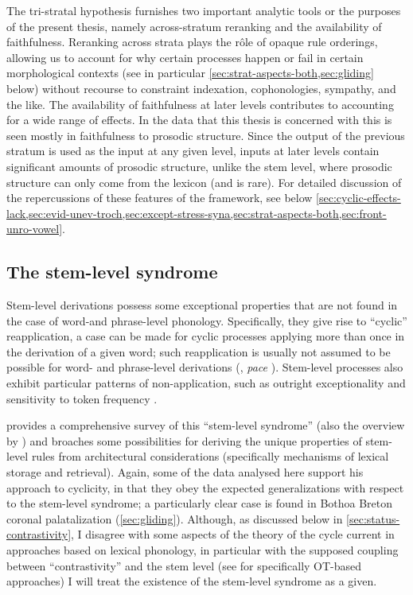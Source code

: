 The tri\hyp stratal hypothesis furnishes two important analytic tools or the purposes of the present thesis, namely across\hyp stratum reranking and the availability of faithfulness. Reranking across strata plays the rôle of opaque rule orderings, allowing us to account for why certain processes happen or fail in certain morphological contexts (see in particular \cref{sec:strat-aspects-both,sec:gliding} below) without recourse to constraint indexation, cophonologies, sympathy, and the like. The availability of faithfulness at later levels contributes to accounting for a wide range of effects. In the data that this thesis is concerned with this is seen mostly in faithfulness to prosodic structure. Since the output of the previous stratum is used as the input at any given level, inputs at later levels contain significant amounts of prosodic structure, unlike the stem level, where prosodic structure can only come from the lexicon (and is rare). For detailed discussion of the repercussions of these features of the framework, see below \cref{sec:cyclic-effects-lack,sec:evid-unev-troch,sec:except-stress-syna,sec:strat-aspects-both,sec:front-unro-vowel}.

\subsection{The stem-level syndrome}
\label{sec:stem-level-syndrome}

Stem\hyp level derivations possess some exceptional properties that are not found in the case of word\hyp and phrase\hyp level phonology. Specifically, they give rise to \enquote{cyclic} reapplication, \ie a case can be made for cyclic processes applying more than once in the derivation of a given word; such reapplication is usually not assumed to be possible for word- and phrase\hyp level derivations (\citealp[§4.3]{scheer10:_guide_morph}, \emph{pace} \citealp{mchugh90:_kirun_chaga}). Stem\hyp level processes also exhibit particular patterns of non\hyp application, such as outright exceptionality and sensitivity to token frequency \citep[\cf in particular][]{collie07:_englis_strat_optim_theor}.

\citet{bermudez-oterong} provides a comprehensive survey of this \enquote{stem\hyp level syndrome} (\cf also the overview by \citealp{kaisse11:_lexic_phonol}) and broaches some possibilities for deriving the unique properties of stem\hyp level rules from architectural considerations (specifically mechanisms of lexical storage and retrieval). Again, some of the data analysed here support his approach to cyclicity, in that they obey the expected generalizations with respect to the stem\hyp level syndrome; a particularly clear case is found in Bothoa Breton coronal palatalization (\cref{sec:gliding}). Although, as discussed below in \cref{sec:status-contrastivity}, I disagree with some aspects of the theory of the cycle current in approaches based on lexical phonology, in particular with the supposed coupling between \enquote{contrastivity} and the stem level (see \citealp{bermudez-otero07:_marked,kiparsky07:_descr} for specifically OT\hyp based approaches) I will treat the existence of the stem\hyp level syndrome as a given.

